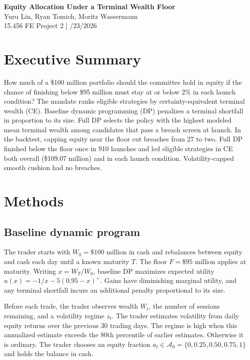\documentclass[10pt]{article}
\begin{document}
\begin{center}
    {\large\bfseries Equity Allocation Under a Terminal Wealth Floor}\\[20pt]
    {\small Yuru Lin, Ryan Tomich, Moritz Wassermann}\\[5pt]
    {\small 15.456 FE Project 2 \enspace | /23/2026}
\end{center}

\section{Executive Summary}
How much of a \$100 million portfolio should the committee hold in equity if the chance of finishing below \$95 million must stay at or below 2\% in each launch condition? The mandate ranks eligible strategies by certainty-equivalent terminal wealth (CE). Baseline dynamic programming (DP) penalizes a terminal shortfall in proportion to its size. Full DP selects the policy with the highest modeled mean terminal wealth among candidates that pass a breach screen at launch. In the backtest, capping equity near the floor cut breaches from 27 to two. Full DP finished below the floor once in 910 launches and led eligible strategies in CE both overall (\$109.07 million) and in each launch condition. Volatility-capped smooth cushion had no breaches.

\section{Methods} \label{sec:methods}

\subsection{Baseline dynamic program}
The trader starts with $W_0=\$100$ million in cash and rebalances between equity and cash each day until a known maturity $T$. The floor $F=\$95$ million applies at maturity. Writing $x=W_T/W_0$, baseline DP maximizes expected utility $u(x)=-1/x-5(0.95-x)^+$. Gains have diminishing marginal utility, and any terminal shortfall incurs an additional penalty proportional to its size.

Before each trade, the trader observes wealth $W_t$, the number of sessions remaining, and a volatility regime $z_t$. The trader estimates volatility from daily equity returns over the previous 30 trading days. The regime is high when this annualized estimate exceeds the 80th percentile of earlier estimates. Otherwise it is ordinary. The trader chooses an equity fraction $a_t\in\mathcal A_0=\{0,0.25,0.50,0.75,1\}$ and holds the balance in cash.
\end{document}

